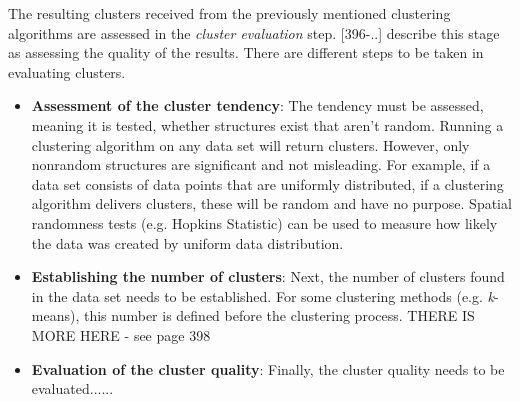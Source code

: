 The resulting clusters received from the previously mentioned clustering algorithms are assessed in the \textit{cluster evaluation} step. \textcite{han2011data}[396-..] describe this stage as assessing the quality of the results.
There are different steps to be taken in evaluating clusters. 
\begin{itemize}
  \item \textbf{Assessment of the cluster tendency}:
  The tendency must be assessed, meaning it is tested, whether structures exist that aren't random. Running a clustering algorithm on any data set will return clusters. However, only nonrandom structures are significant and not misleading. For example, if a data set consists of data points that are uniformly distributed, if a clustering algorithm delivers clusters, these will be random and have no purpose. Spatial randomness tests (e.g. Hopkins Statistic) can be used to measure how likely the data was created by uniform data distribution.

  \item \textbf{Establishing the number of clusters}:
  Next, the number of clusters found in the data set needs to be established. For some clustering methods (e.g. \textit{k}-means), this number is defined before the clustering process. THERE IS MORE HERE - see page 398

  \item \textbf{Evaluation of the cluster quality}:
  Finally, the cluster quality needs to be evaluated......
\end{itemize}



